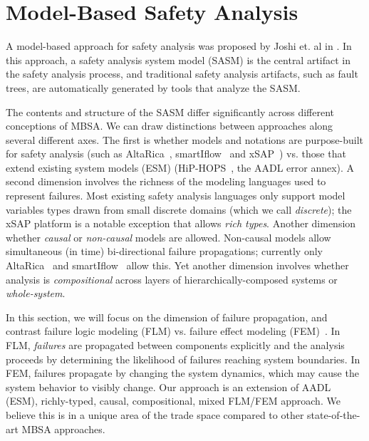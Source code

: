\section{Model-Based Safety Analysis}


A model-based approach for safety analysis was proposed by Joshi et. al in \cite{Joshi05:Dasc, Joshi05:SafeComp, Joshi07:Hase}.  In this approach, a safety analysis system model (SASM) is the central artifact in the safety analysis process, and traditional safety analysis artifacts, such as fault trees, are automatically generated by tools that analyze the SASM.

The contents and structure of the SASM differ significantly across different conceptions of MBSA.  We can draw distinctions between approaches along several different axes.  The first is whether models and notations are purpose-built for safety analysis (such as AltaRica~\cite{PROSVIRNOVA2013127}, smartIflow~\cite{info8010007} and xSAP~\cite{DBLP:conf/tacas/BittnerBCCGGMMZ16}) vs. those that extend existing system models (ESM) (HiP-HOPS~\cite{CHEN201391}, the AADL error annex\cite{SAEAS}).  A second dimension involves the richness of the modeling languages used to represent failures.  Most existing safety analysis languages only support model variables types drawn from small discrete domains (which we call {\em discrete}); the xSAP platform is a notable exception that allows {\em rich types}.  Another dimension whether {\em causal } or {\em non-causal} models are allowed.  Non-causal models allow simultaneous (in time) bi-directional failure propagations; currently only AltaRica~\cite{PROSVIRNOVA2013127} and smartIflow~\cite{info8010007} allow this.  Yet another dimension involves whether analysis is {\em compositional} across layers of hierarchically-composed systems or {\em whole-system}.

In this section, we will focus on the dimension of failure propagation, and contrast failure logic modeling (FLM) vs. failure effect modeling (FEM)~\cite{5979344}.  In FLM, {\em failures} are propagated between components explicitly and the analysis proceeds by determining the likelihood of failures reaching system boundaries.  In FEM, failures propagate by changing the system dynamics, which may cause the system behavior to visibly change.  Our approach is an extension of AADL (ESM), richly-typed, causal, compositional, mixed FLM/FEM approach. We believe this is in a unique area of the trade space compared to other state-of-the-art MBSA approaches.

